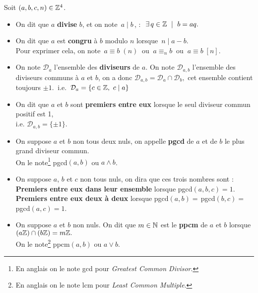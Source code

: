 Soit \((a,b,c,n)\in \mathbb{Z}^4\).
\begin{itemize}[leftmargin=0.5cm, label=•]
    \item On dit que $a$ \textbf{divise} $b$, et on note \(\,a\mid b\,\), \ssi : \(\ \exists\,q\in \ZZ \ \mid \ b=aq.\)
    
    \item On dit que $a$ est \textbf{congru} à $b$ modulo $n$ lorsque \(\,n\mid a-b\).\\
    Pour exprimer cela, on note \(\,a\equiv b\; (n)\ \) ou \(\ a\equiv_n \!b\ \) ou \(\ a\equiv b\; [n]\).

    \item On note \(\mathcal{D}_a\) l'ensemble des \textbf{diviseurs} de $a$. On note \(\mathcal{D}_{a,b}\) l'ensemble des diviseurs communs à $a$ et $b$, on a donc \(\mathcal{D}_{a,b}=\mathcal{D}_a\cap \mathcal{D}_b,\) cet ensemble contient toujours \(\pm 1.\ \)
    i.e. \(\,\mathcal{D}_a=\{c\in \mathbb{Z},\ c\mid a\} \)

    \item On dit que $a$ et $b$ sont \textbf{premiers entre eux} lorsque le seul diviseur commun positif est 1,\\
    i.e. \(\mathcal{D}_{a,b}=\{\pm 1\}\).
    
    \item On suppose $a$ et $b$ non tous deux nuls, on appelle \textbf{pgcd} de $a$ et de $b$ le plus grand diviseur commun.\\
    On le note\footnote{En anglais on le note gcd pour \emph{Greatest Common Divisor}.} pgcd$(a,b)$ ou $a\land b$.

    \item On suppose $a$, $b$ et $c$ non tous nuls, on dira que ces trois nombres sont :\\
    \textbf{Premiers entre eux dans leur ensemble} lorsque pgcd\((a,b,c)=1.\)\\
    \textbf{Premiers entre eux deux à deux} lorsque pgcd$(a,b)=\,$pgcd$(b,c)=\,$pgcd$(a,c)=1.$

    \item On suppose $a$ et $b$ non nuls. On dit que $m\in \mathbb{N}$\expo{*} est le \textbf{ppcm} de $a$ et $b$ lorsque \((a\mathbb{Z})\cap(b\mathbb{Z})=m\mathbb{Z}.\)\\
    On le note\footnote{En anglais on le note lcm pour \emph{Least Common Multiple}.} ppcm$(a,b)$ ou $a\lor b$.
\end{itemize}

